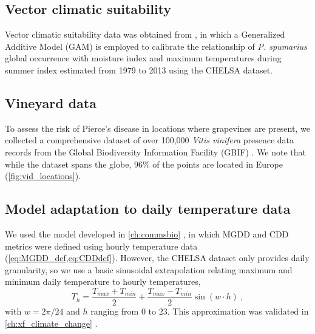 \subsection{Vector climatic suitability}

Vector climatic suitability data was obtained from \cite{Godefroid2022}, in
which a Generalized Additive Model (GAM) is employed to calibrate the
relationship of \textit{P. spumarius} global occurrence with moisture index and
maximum temperatures during summer index estimated from 1979 to 2013 using the
CHELSA dataset.

\subsection{Vineyard data}

To assess the risk of Pierce's disease in locations where grapevines are
present, we collected a comprehensive dataset of over 100,000 \textit{Vitis
    vinifera} presence data records from the Global Biodiversity Information
Facility (GBIF) \cite{noauthor_what_nodate,GBIF}. We note that while the
dataset spans the globe, 96\% of the points are located in Europe
(\cref{fig:vid_locations}).

\subsection{Model adaptation to daily temperature data}

We used the model developed in \cref{ch:commsbio}
\cite{GimenezRomero2022_CommsBio}, in which MGDD and CDD metrics were defined
using hourly temperature data (\cref{eq:MGDD_def,eq:CDDdef}). However, the
CHELSA dataset only provides daily granularity, so we use a basic sinusoidal
extrapolation relating maximum and minimum daily temperature to hourly
temperatures,
\begin{equation}
    T_h=\frac{T_{max}+T_{min}}{2} + \frac{T_{max}-T_{min}}{2}\sin(w\cdot h)
    \ ,
\end{equation}
with $w=2\pi/24$ and $h$ ranging from $0$ to $23$. This approximation was
validated in \cref{ch:xf_climate_change} \cite{GimenezRomero2023_PD}.